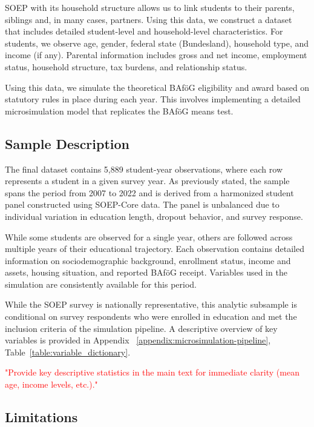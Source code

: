 SOEP with its household structure allows us to link students to their parents, siblings and, in many cases, partners.
Using this data, we construct a dataset that includes detailed student-level and household-level characteristics. 
For students, we observe age, gender, federal state (Bundesland), household type, and income (if any). 
Parental information includes gross and net income, employment status, household structure, tax burdens, and relationship status. 

Using this data, we simulate the theoretical BAföG eligibility and award based on statutory rules in place during each year. 
This involves implementing a detailed microsimulation model that replicates the BAföG means test.

\subsection{Sample Description}
The final dataset contains 5,889 student-year observations, where each row represents a student in a given survey year. As previously stated, the sample spans the period from 2007 to 2022 and is derived from a harmonized student panel constructed using SOEP-Core data. The panel is unbalanced due to individual variation in education length, dropout behavior, and survey response. 

While some students are observed for a single year, others are followed across multiple years of their educational trajectory. Each observation contains detailed information on sociodemographic background, enrollment status, income and assets, housing situation, and reported BAföG receipt. Variables used in the simulation are consistently available for this period.

While the SOEP survey is nationally representative, this analytic subsample is conditional on survey respondents who were enrolled in education and met the inclusion criteria of the simulation pipeline. 
A descriptive overview of key variables is provided in Appendix ~\ref{appendix:microsimulation-pipeline}, Table~\ref{table:variable_dictionary}.

\textcolor{red}{"Provide key descriptive statistics in the main text for immediate clarity (mean age, income levels, etc.)."}

\subsection{Limitations}

